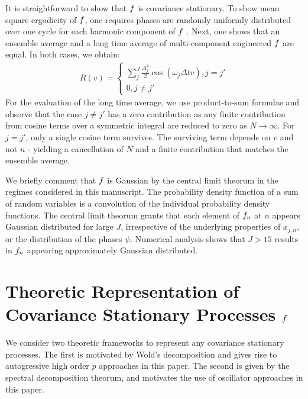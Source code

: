 It is straightforward to show that $f$ is covariance stationary. To show mean square ergodicity of $f$, one requires phases are randomly uniformly distributed over one cycle for each harmonic component of $f$ \cite{gelb1974applied}. Next, one shows that an ensemble average and a long time average of multi-component engineered $f$ are equal. In both cases, we obtain:
\begin{align}
R(v) = \begin{cases} \sum_j^J \frac{A_j^2}{2} \cos(\omega_j \Delta t v), j = j' \\ 0, j \neq j'
\end{cases}
\end{align} For the evaluation of the long time average, we use product-to-sum formulae and observe that the case $j\neq j'$ has a zero contribution as any finite contribution from cosine terms over a symmetric integral are reduced to zero as $N \rightarrow \infty $.  For $j = j'$, only a single cosine term survives. The surviving term depends on $v$ and not $n$ - yielding a cancellation of $N$ and a finite contribution that matches the ensemble average.

We briefly comment that $f$ is Gaussian by the central limit theorum in the regimes considered in this manuscript. The probability density function of a sum of random variables is a convolution of the individual probability density functions. The central limit theorum grants that each element of $f_n$ at $n$ appears Gaussian distributed for large $J$, irrespective of the underlying properties of $x_{j,n}$, or the distribution of the phases $\psi$. Numerical analysis shows that $J > 15$ results in $f_n$ appearing approximately Gaussian distributed. 


\section{Theoretic Representation of Covariance Stationary Processes $f$ \label{sec:app:predictors}}
We consider two theoretic frameworks to represent any covariance stationary processes. The first is motivated by Wold's decomposition and gives rise to autogressive high order $p$ approaches in this paper. The second is given by the spectral decomposition theorum, and motivates the use of oscillator approaches in this paper. 

